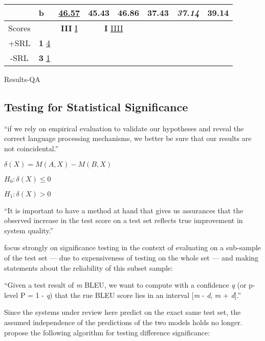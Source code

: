 {{\begin{tabular}{llccc|ccc}
      \multicolumn{1}{c}{}                       & b  & \multicolumn{1}{c|}{\underline{46.57}}          & \multicolumn{1}{c}{45.43}             & \multicolumn{1}{c|}{\textbf{46.86}}    & \multicolumn{1}{c|}{37.43}          & \multicolumn{1}{c}{\textit{37.14}} & \multicolumn{1}{c}{39.14}          \\ \hline\hline
      \multicolumn{1}{c}{Scores}                 &    & \multicolumn{1}{c|}{\textbf{III} \underline{I}} & \multicolumn{2}{c|}{\textbf{I} \underline{IIII}}                               & \multicolumn{1}{c|}{} \\ \cline{1-2}
      \multicolumn{1}{c}{+SRL}                   & \textbf{1} \underline{4} \\
      \multicolumn{1}{c}{-SRL}                   & \textbf{3} \underline{1}

      \end{tabular}
    }
  }{Results-QA}


\subsection{Testing for Statistical Significance}

``if we rely on empirical evaluation to validate our hypotheses and reveal the correct language processing mechanisms, we better be sure that our results are not coincidental.'' \citep{dror2018hitchhiker}


$\delta(X) = M(A, X) - M(B, X)$

$H_0:\delta(X) \leq 0$

$H_1:\delta(X) > 0$

``It is important to have a method at hand that gives us assurances that the
observed increase in the test score on a test set reflects true improvement in system
quality.'' \citep{koehn2004statistical}

\citet{koehn2004statistical} focus strongly on significance testing in the context of evaluating
on a sub-sample of the test set --- due to expensiveness of testing on the whole set ---
and making statements about the reliability of this subset sample:

``Given a test result of \emph{m} BLEU, we want to compute with a confidence \emph{q} (or
p-level P = 1 - \emph{q}) that the rue BLEU score lies in an interval [\emph{m} - \emph{d},
\emph{m} + \emph{d}].'' \citep{koehn2004statistical}

Since the systems under review here predict on the exact same test set, the assumed independence
of the predictions of the two models holds no longer. \citet{morgan2005statistical} propose
the following algorithm for testing difference significance:

